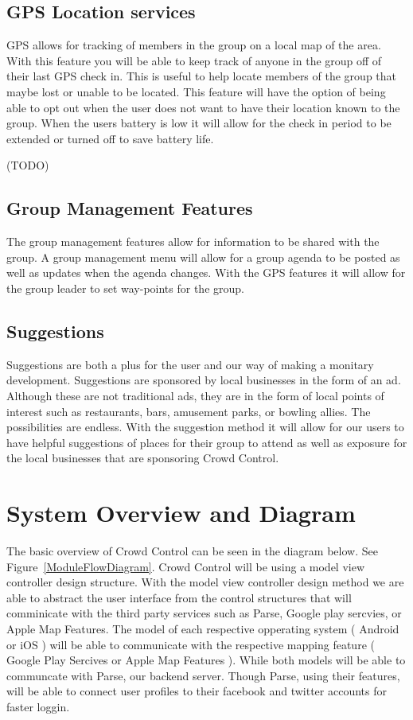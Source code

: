 \subsection{GPS Location services}
GPS allows for tracking of members in the group on a local map of the area. With this feature you will be able to keep track of anyone in the group off of their last GPS check in. This is useful to help locate members of the group that maybe lost or unable to be located. This feature will have the option of being able to opt out when the user does not want to have their location known to the group. When the users battery is low it will allow for the check in period to be extended or turned off to save battery life.

(TODO)

\subsection{Group Management Features}
The group management features allow for information to be shared with the group. A group management menu will allow for a group agenda to be posted as well as updates when the agenda changes. With the GPS features it will allow for the group leader to set way-points for the group.  

\subsection{Suggestions}
Suggestions are both a plus for the user and our way of making a monitary development. Suggestions are sponsored by local businesses in the form of an ad. Although these are not traditional ads, they are in the form of local points of interest such as restaurants, bars, amusement parks, or bowling allies. The possibilities are endless. With the suggestion method it will allow for our users to have helpful suggestions of places for their group to attend as well as exposure for the local businesses that are sponsoring Crowd Control.


\section{System Overview and Diagram}
The basic overview of Crowd Control can be seen in the diagram below. See Figure~\ref{ModuleFlowDiagram}. Crowd Control will be using a model view controller design structure. With the model view controller design method we are able to abstract the user interface from the control structures that will comminicate with the third party services such as Parse, Google play sercvies, or Apple Map Features. The model of each respective opperating system ( Android or iOS ) will be able to communicate with the respective mapping feature ( Google Play Sercives or Apple Map Features ). While both models will be able to communcate with Parse, our backend server. Though Parse, using their features, will be able to connect user profiles to their facebook and twitter accounts for faster loggin.

